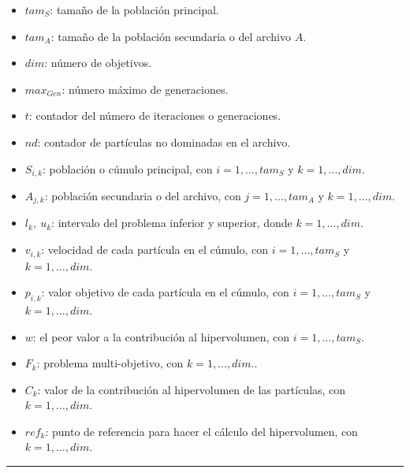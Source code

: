  \begin{itemize}
    \item $tam_S$: tama\~no de la poblaci\'on principal.
    \item $tam_A$: tama\~no de la poblaci\'on secundaria o del archivo $A$.
    \item $dim$: n\'umero de objetivos.
    \item $max_{Gen}$: n\'umero m\'aximo de generaciones.
    \item $t$: contador del n\'umero de iteraciones o generaciones.
    \item $nd$: contador de part\'iculas no dominadas en el archivo.
    \item $S_{i,k}$: poblaci\'on o c\'umulo principal, con $i= 1, \ldots, tam_S$ y $k = 1,\ldots, dim$.  
    \item $A_{j,k}$: poblaci\'on secundaria o del archivo, con $j = 1, \ldots, tam_A$ y $k = 1,\ldots, dim$.
    \item $l_k,\ u_k$: intervalo del problema inferior y superior, donde $k = 1,\ldots, dim$.
    \item $v_{i,k}$: velocidad de cada part\'icula en el c\'umulo, con $i= 1, \ldots, tam_S$ y $k = 1,\ldots, dim$.
    \item $p_{i,k}$: valor objetivo de cada part\'icula en el c\'umulo, con $i= 1, \ldots, tam_S$ y $k = 1,\ldots, dim$.
    \item $w$: el peor valor a la contribuci\'on al hipervolumen, con $i= 1, \ldots, tam_S$.
    \item $F_{k}$: problema multi-objetivo, con $k = 1,\ldots, dim$..
    \item $C_{k}$: valor de la contribuci\'on al hipervolumen de las part\'iculas, con $k = 1,\ldots, dim$.
    \item $ref_{k}$: punto de referencia para hacer el c\'alculo del hipervolumen, con $k = 1,\ldots, dim$.    
  \end{itemize}
  \rule{\linewidth}{1pt}
  
